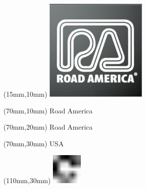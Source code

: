 \null\newpage
\begin{textblock*}{50mm}(15mm,10mm)%
\includegraphics[width=50mm]{LG/2015-05-20_00092.png}
\end{textblock*}
\begin{textblock*}{130mm}(70mm,10mm)%
{\fontsize{20}{20}\selectfont Road America}\\
\end{textblock*}
\begin{textblock*}{120mm}(70mm,20mm)%
{\fontsize{16}{16}\selectfont Road America}\\
\end{textblock*}
\begin{textblock*}{120mm}(70mm,30mm)%
{\fontsize{12}{12}\selectfont USA}
\end{textblock*}
\begin{textblock*}{30mm}(110mm,30mm)%
\centering
\includegraphics[height=15mm]{icons/fa-rotate-right.pdf}
\end{textblock*}
